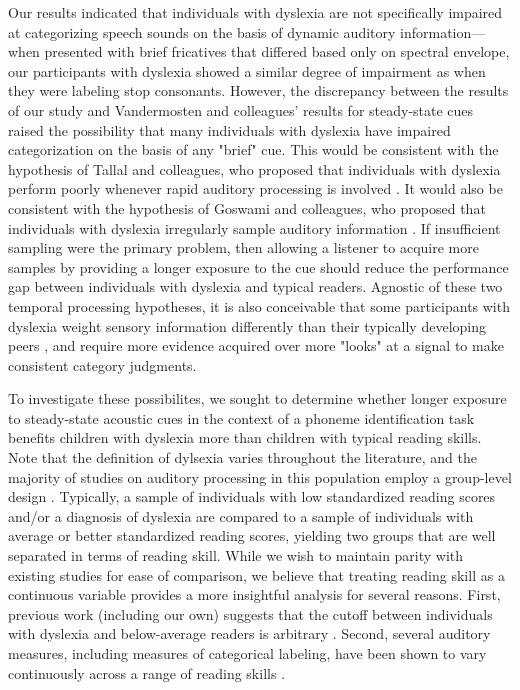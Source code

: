 \documentclass[../uwthesis.tex]{subfiles}
\begin{document}
Our results indicated that individuals with dyslexia are not specifically impaired at categorizing speech sounds on the basis of dynamic auditory information---when presented with brief fricatives that differed based only on spectral envelope, our participants with dyslexia showed a similar degree of impairment as when they were labeling stop consonants. However, the discrepancy between the results of our study and Vandermosten and colleagues' results for steady-state cues raised the possibility that many individuals with dyslexia have impaired categorization on the basis of any "brief" cue. This would be consistent with the hypothesis of Tallal and colleagues, who proposed that individuals with dyslexia perform poorly whenever rapid auditory processing is involved \cite{Merzenich1996,Tallal1996h}. It would also be consistent with the hypothesis of Goswami and colleagues, who proposed that individuals with dyslexia irregularly sample auditory information \cite{Goswami2011}. If insufficient sampling were the primary problem, then allowing a listener to acquire more samples by providing a longer exposure to the cue should reduce the performance gap between individuals with dyslexia and typical readers. Agnostic of these two temporal processing hypotheses, it is also conceivable that some participants with dyslexia weight sensory information differently than their typically developing peers \cite{Nittrouer1999}, and require more evidence acquired over more "looks" at a signal to make consistent category judgments.

To investigate these possibilites, we sought to determine whether longer exposure to steady-state acoustic cues in the context of a phoneme identification task benefits children with dyslexia more than children with typical reading skills. Note that the definition of dylsexia varies throughout the literature, and the majority of studies on auditory processing in this population employ a group-level design \cite{Calcus2016, Law2014, Ramus2003, Talcott2000}. Typically, a sample of individuals with low standardized reading scores and/or a diagnosis of dyslexia are compared to a sample of individuals with average or better standardized reading scores, yielding two groups that are well separated in terms of reading skill. While we wish to maintain parity with existing studies for ease of comparison, we believe that treating reading skill as a continuous variable provides a more insightful analysis for several reasons. First, previous work (including our own) suggests that the cutoff between individuals with dyslexia and below-average readers is arbitrary \cite{OBrien2018, Shaywitz1992}. Second, several auditory measures, including measures of categorical labeling, have been shown to vary continuously across a range of reading skills \cite{Goswami2002,OBrien2018,Vandermosten2010}. 
\end{document}
